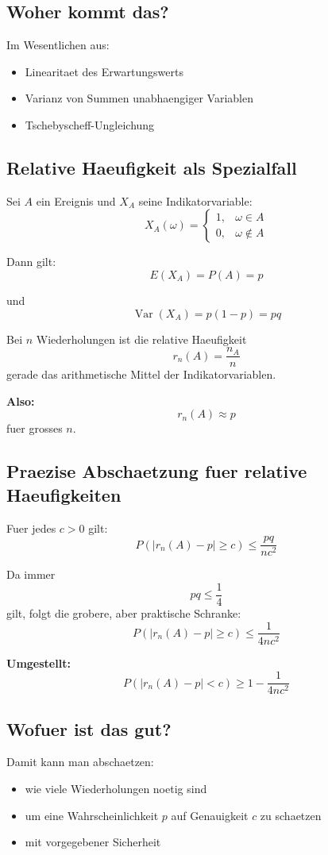 \documentclass[a4paper,11pt]{article}
\begin{document}
\subsection{Woher kommt das?}
Im Wesentlichen aus:
\begin{itemize}
  \item Linearitaet des Erwartungswerts
  \item Varianz von Summen unabhaengiger Variablen
  \item Tschebyscheff-Ungleichung
\end{itemize}

\subsection{Relative Haeufigkeit als Spezialfall}
Sei $A$ ein Ereignis und $X_A$ seine Indikatorvariable:
\[
X_A(\omega)=
\begin{cases}
1,& \omega \in A \\
0,& \omega \notin A
\end{cases}
\]

Dann gilt:
\[
E(X_A)=P(A)=p
\]

und
\[
\operatorname{Var}(X_A)=p(1-p)=pq
\]

Bei $n$ Wiederholungen ist die relative Haeufigkeit
\[
r_n(A)=\frac{n_A}{n}
\]
gerade das arithmetische Mittel der Indikatorvariablen.

\textbf{Also:}
\[
r_n(A)\approx p
\]
fuer grosses $n$.

\subsection{Praezise Abschaetzung fuer relative Haeufigkeiten}
Fuer jedes $c>0$ gilt:
\[
P(|r_n(A)-p|\ge c)\le \frac{pq}{n c^2}
\]

Da immer
\[
pq\le \frac14
\]
gilt, folgt die grobere, aber praktische Schranke:
\[
P(|r_n(A)-p|\ge c)\le \frac{1}{4nc^2}
\]

\textbf{Umgestellt:}
\[
P(|r_n(A)-p|<c)\ge 1-\frac{1}{4nc^2}
\]

\subsection{Wofuer ist das gut?}
Damit kann man abschaetzen:
\begin{itemize}
  \item wie viele Wiederholungen noetig sind
  \item um eine Wahrscheinlichkeit $p$ auf Genauigkeit $c$ zu schaetzen
  \item mit vorgegebener Sicherheit
\end{itemize}
\end{document}
